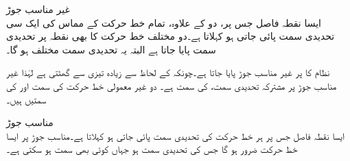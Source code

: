 \quad غیر مناسب جوڑ\\
ایسا نقطہ فاصل  جس پر، دو  کے علاوہ، تمام خط حرکت کے  مماس کی ایک سی  تحدیدی سمت پائی جاتی ہو  کہلاتا ہے۔دو مختلف خط حرکت کا بھی نقطہ  پر تحدیدی سمت پایا جاتا ہے البتہ یہ تحدیدی سمت مختلف ہو گا۔

نظام  کا  پر غیر مناسب جوڑ پایا جاتا ہے۔چونکہ  کے لحاظ سے  زیادہ تیزی سے گھٹتی ہے لہٰذا  غیر مناسب جوڑ پر مشترکہ تحدیدی سمت،   کی سمت ہے۔ دو غیر معمولی خط حرکت کی
 سمت  اور  کی سمتیں ہیں۔

\quad مناسب جوڑ\\
ایسا نقطہ فاصل  جس پر ہر خط حرکت کی  تحدیدی سمت پائی جاتی ہو  کہلاتا ہے۔مناسب جوڑ پر ایسا خط حرکت ضرور ہو گا جس کی تحدیدی سمت  ہو جہاں  کوئی بھی سمت ہو سکتی ہے۔

